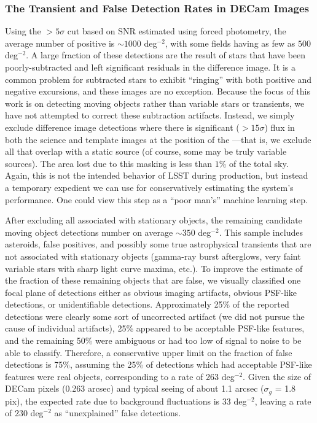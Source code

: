 \subsubsection{The Transient and False Detection Rates in DECam Images}

Using the $>5\sigma$ cut based on SNR estimated using forced photometry,
the average number of positive \DIASources is $\sim 1000$ deg$^{-2}$,
with some fields having as few as $500$ deg$^{-2}$. A large fraction of
these detections are the result of stars that have been poorly-subtracted and
left significant residuals in the difference image. It is a common problem for
subtracted stars to exhibit ``ringing'' with both positive and negative
excursions, and these images are no exception. Because the focus of this work
is on detecting moving objects rather than variable stars or transients, we have
not attempted to correct these subtraction artifacts. Instead, we simply exclude
difference image detections where there is significant ($>15 \sigma$) flux in both the
science and template images at the position of the \DIASource---that is, we exclude all \DIASources that
overlap with a static source (of course, some may be truly variable sources).
The area lost due to this masking is less than $1\%$ of the total sky. Again, this
is not the intended behavior of LSST during production, but instead a temporary
expedient we can use for conservatively estimating the system's performance.
One could view this step as a ``poor man's'' machine learning step.

After excluding all \DIASources associated with stationary objects, the
remaining candidate moving object detections number on average $\sim 350$
deg$^{-2}$. This sample includes asteroids, false positives, and possibly some
true astrophysical transients that are not associated with stationary objects
(gamma-ray burst afterglows, very faint variable stars with sharp light
curve maxima, etc.). To improve the estimate of the fraction of these remaining
objects that are false, we visually classified one focal plane of detections either
as obvious imaging artifacts, obvious PSF-like detections, or unidentifiable
detections. Approximately 25\% of the reported detections were clearly some
sort of uncorrected artifact (we did not pursue the cause of individual artifacts),
25\% appeared to be acceptable PSF-like features, and the remaining 50\% were
ambiguous or had too low of signal to noise to be able to classify.
Therefore, a conservative upper limit on the fraction of false detections is 75\%,
assuming the 25\% of detections which had acceptable PSF-like features were real objects,
corresponding to a rate of 263 deg$^{-2}$. Given the size of DECam pixels
(0.263 arcsec) and typical seeing of about 1.1 arcsec ($\sigma_g$ = 1.8 pix),
the expected rate due to background fluctuations is 33 deg$^{-2}$, leaving
a rate of 230 deg$^{-2}$ as ``unexplained'' false detections.

